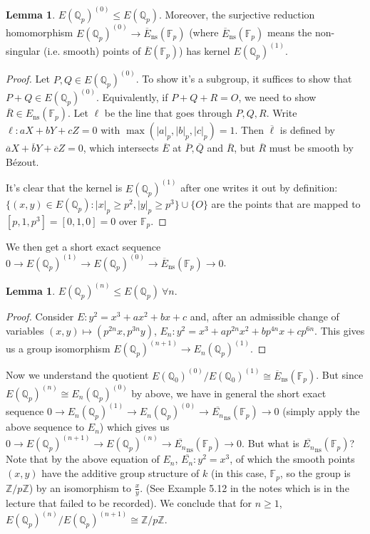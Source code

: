\documentclass{article}
\newcommand{\F}{\mathbb{F}}
\newcommand{\Z}{\mathbb{Z}}
\newcommand{\Q}{\mathbb{Q}}
\theoremstyle{definition}
\newtheorem{lemma}[defn]{Lemma}
\begin{document}
\begin{lemma}
$E(\Q_p)^{(0)}\leq E(\Q_p)$. Moreover, the surjective reduction homomorphism $E(\Q_p)^{(0)}\rightarrow\overline E_{\operatorname{ns}}(\F_p)$ (where $\overline E_{\operatorname{ns}}(\F_p)$ means the non-singular (i.e. smooth) points of $\overline E(\F_p)$) has kernel $E(\Q_p)^{(1)}$.
\end{lemma}
\begin{proof}
Let $P,Q\in E(\Q_p)^{(0)}$. To show it's a subgroup, it suffices to show that $P+Q\in E(\Q_p)^{(0)}$. Equivalently, if $P+Q+R=O$, we need to show $\overline R\in E_{\operatorname{ns}}(\F_p)$. Let $\ell$ be the line that goes through $P,Q,R$. Write $\ell:aX+bY+cZ=0$ with $\max(|a|_p,|b|_p,|c|_p)=1$. Then $\overline\ell$ is defined by $\overline aX+\overline bY+\overline cZ=0$, which intersects $\overline E$ at $\overline P,\overline Q$ and $\overline R$, but $\overline R$ must be smooth by Bézout.

It's clear that the kernel is $E(\Q_p)^{(1)}$ after one writes it out by definition: $\{(x,y)\in E(\Q_p):|x|_p\geq p^2,|y|_p\geq p^3\}\cup\{O\}$ are the points that are mapped to $[p,1,p^3]=[0,1,0]=0$ over $\F_p$.
\end{proof}

We then get a short exact sequence $0\rightarrow E(\Q_p)^{(1)}\rightarrow E(\Q_p)^{(0)}\rightarrow \overline E_{\operatorname{ns}}(\F_p)\rightarrow 0$.

\begin{lemma}
$E(\Q_p)^{(n)}\leq E(\Q_p) \ \forall n$.
\end{lemma}
\begin{proof}
Consider $E:y^2=x^3+ax^2+bx+c$ and, after an admissible change of variables $(x,y)\mapsto (p^{2n}x,p^{3n}y)$, $E_n:y^2=x^3+ap^{2n}x^2+bp^{4n}x+cp^{6n}$. This gives us a group isomorphism $E(\Q_p)^{(n+1)}\rightarrow E_n(\Q_p)^{(1)}$.
\end{proof}

Now we understand the quotient $E(\Q_0)^{(0)}/E(\Q_0)^{(1)}\cong\overline E_{\operatorname{ns}}(\F_p)$. But since $E(\Q_p)^{(n)}\cong E_n(\Q_p)^{(0)}$ by above, we have in general the short exact sequence $0\rightarrow E_n(\Q_p)^{(1)}\rightarrow E_n(\Q_p)^{(0)}\rightarrow \overline{E_n}_{\operatorname{ns}}(\F_p)\rightarrow 0$ (simply apply the above sequence to $E_n$) which gives us $0\rightarrow E(\Q_p)^{(n+1)}\rightarrow E(\Q_p)^{(n)}\rightarrow \overline{E_n}_{\operatorname{ns}}(\F_p) \rightarrow 0$. But what is $\overline{E_n}_{\operatorname{ns}}(\F_p)$? Note that by the above equation of $E_n$, $\overline{E_n}:y^2=x^3$, of which the smooth points $(x,y)$ have the additive group structure of $k$ (in this case, $\F_p$, so the group is $\Z/p\Z$) by an isomorphism to $\frac{x}{y}$. (See Example 5.12 in the notes which is in the lecture that failed to be recorded). We conclude that for $n\geq 1$, $E(\Q_p)^{(n)}/E(\Q_p)^{(n+1)}\cong\Z/p\Z$.
\end{document}
